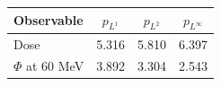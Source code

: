 \begin{tabular}{lccc}
\toprule
Observable & $p_{L^1}$ & $p_{L^2}$ & $p_{L^\infty}$ \\
\midrule
Dose & 5.316 & 5.810 & 6.397 \\
$\Phi$ at 60 MeV & 3.892 & 3.304 & 2.543 \\
\bottomrule
\end{tabular}
